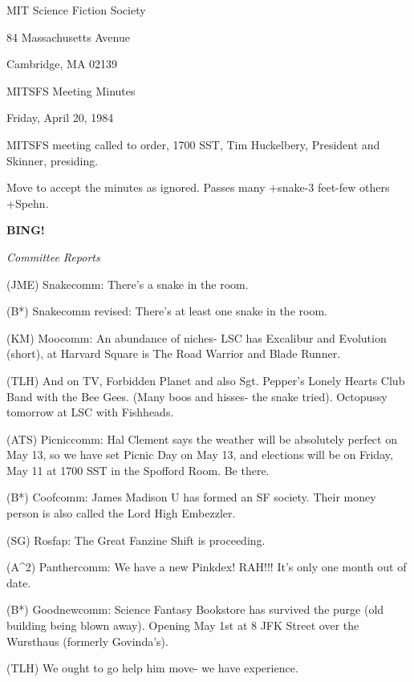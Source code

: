 \documentclass[12pt]{article}
\newcommand{\bing}{{\bf BING!} }
\newcommand{\goto}[1]{\bing \vskip 12pt \centerline{{\em{#1}}}}
\begin{document}
\begin{center}

MIT Science Fiction Society 

84 Massachusetts Avenue

Cambridge, MA 02139

\vspace{12pt}

MITSFS Meeting Minutes 

Friday, April 20, 1984

\end{center}
 
\vspace{18pt}

\setlength{\parskip}{6pt}

\noindent
MITSFS meeting called to order, 1700 SST,
Tim Huckelbery, President and Skinner, presiding.

Move to accept the minutes as ignored. Passes many +snake-3 feet-few others +Spehn.

\goto{Committee Reports}

(JME) Snakecomm: There's a snake in the room.

(B*) Snakecomm revised: There's at least one snake in the room.

(KM) Moocomm: An abundance of niches- LSC has Excalibur and Evolution (short), at Harvard Square is The Road Warrior and Blade Runner.

(TLH) And on TV, Forbidden Planet and also Sgt. Pepper's Lonely Hearts Club Band with the Bee Gees. (Many boos and hisses- the snake tried). Octopussy tomorrow at LSC with Fishheads.

(ATS) Picniccomm: Hal Clement says the weather will be absolutely perfect on May 13, so we have set Picnic Day on May 13, and elections will be on Friday, May 11 at 1700 SST in the Spofford Room. Be there.

(B*) Coofcomm: James Madison U has formed an SF society. Their money person is also called the Lord High Embezzler.

(SG) Rosfap: The Great Fanzine Shift is proceeding.

(A^2) Panthercomm: We have a new Pinkdex! RAH!!! It's only one month out of date.

(B*) Goodnewcomm: Science Fantasy Bookstore has survived the purge (old building being blown away). Opening May 1st at 8 JFK Street over the Wursthaus (formerly Govinda's).

(TLH) We ought to go help him move- we have experience.
\end{document}
